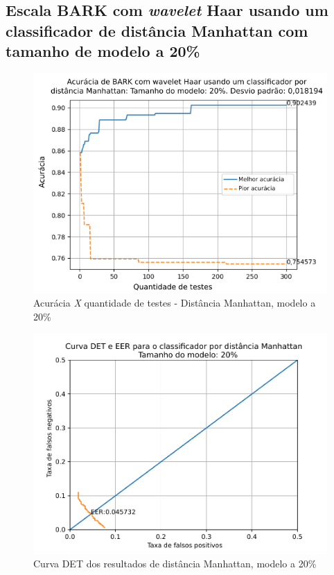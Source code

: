 			\FloatBarrier
		\subsection{Escala BARK com \textit{wavelet} Haar usando um classificador de distância Manhattan com tamanho de modelo a 20\%}
			
			
	
			\begin{figure}[!ht]
				\centering
				\includegraphics[width=\linewidth]{images/results/confusionMatrices/classifier_Manhattan_20.png}
				\caption{Acurácia \textit{X} quantidade de testes - Distância Manhattan, modelo a 20\%}
				\label{fig:classifiermanhattan20}
			\end{figure}
		
			\begin{figure}[!h]
				\centering
				\includegraphics[width=.9\linewidth]{images/results/det/DET_for_classifier_Manhattan_20}
				\caption{Curva DET dos resultados de distância Manhattan, modelo a 20\%}
				\label{fig:detforclassifiermanhattan20}
			\end{figure}
	
